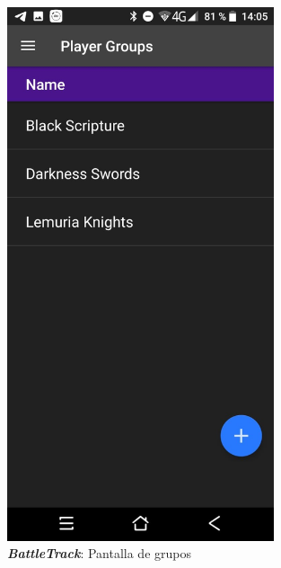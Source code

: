 \begin{figure}[H]
    \centering
    \begin{minipage}{0.3\textwidth}
        \centering
        \includegraphics[width=0.7\textwidth]{Images/BattleTrack_1.jpeg}
        \caption{\textit{\textbf{BattleTrack}}: Pantalla de grupos }
        

\end{minipage}
\end{figure}
